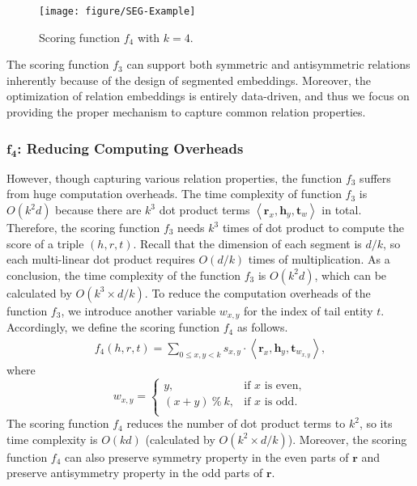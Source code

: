 \documentclass[11pt,a4paper]{article}
\newcommand{\SegVec}[1]{\mathbf{#1}}
\begin{document}
\begin{figure}[!h]
	\centering
	\texttt{[image: figure/SEG-Example]}
	\caption{Scoring function $f_4$ with $k=4$.}
	\label{fig:embedding_example}
\end{figure}

The scoring function $f_3$ can support both symmetric and antisymmetric relations inherently because of the design of segmented embeddings.
Moreover, the optimization of relation embeddings is entirely data-driven, and thus we focus on providing the proper mechanism to capture common relation properties.

\subsubsection{$\bm{f_4}$: Reducing Computing Overheads}
However, though capturing various relation properties, the function $f_3$ suffers from huge computation overheads.
The time complexity of function $f_3$ is $O(k^2d)$ because there are $k^3$ dot product terms $\left< \SegVec{r}_x, \SegVec{h}_y, \SegVec{t}_w \right>$ in total.
Therefore, the scoring function $f_3$ needs $k^3$ times of dot product to compute the score of a triple $(h, r, t)$.
Recall that the dimension of each segment is $d/k$, so each multi-linear dot product requires $O(d/k)$ times of multiplication.
As a conclusion, the time complexity of the function $f_3$ is $O(k^2 d)$, which can be calculated by $O(k^3 \times d/k)$.
To reduce the computation overheads of the function $f_3$, we introduce another variable $w_{x,y}$ for the index of tail entity $t$.
Accordingly, we define the scoring function $f_4$ as follows.
\begin{align}
f_4(h, r, t) = \sum_{0 \leq x, y < k} s_{x, y} \cdot \left< \SegVec{r}_x, \SegVec{h}_y, \SegVec{t}_{w_{x,y}} \right>,
\label{eq:seek-score-function}
\end{align}
where
\[
w_{x, y} = 
\left\{
\begin{array}{cl}
y, & \text{if } x \text{ is even}, \\
(x + y) \ \% \ k,  & \text{if } x \text{ is odd}. \\
\end{array}
\right.
\]
The scoring function $f_4$ reduces the number of dot product terms to $k^2$, so its time complexity is $O(kd)$ (calculated by $O(k^2\times d/k)$).
Moreover, the scoring function $f_4$ can also preserve symmetry property in the even parts of $\SegVec{r}$ and preserve antisymmetry property in the odd parts of $\SegVec{r}$. 
\end{document}
